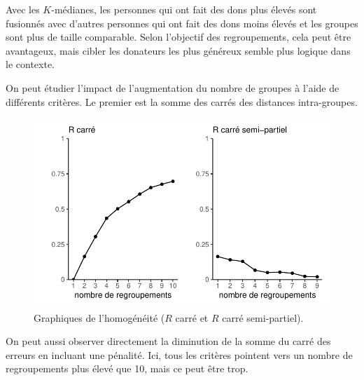 \documentclass[
  11pt,
  letterpaper,
]{scrbook}
\newenvironment{Shaded}{\begin{snugshade}}{\end{snugshade}}
\newcommand{\CommentTok}[1]{\textcolor[rgb]{0.37,0.37,0.37}{#1}}
\newcommand{\ControlFlowTok}[1]{\textcolor[rgb]{0.00,0.23,0.31}{#1}}
\newcommand{\FunctionTok}[1]{\textcolor[rgb]{0.28,0.35,0.67}{#1}}
\newcommand{\NormalTok}[1]{\textcolor[rgb]{0.00,0.23,0.31}{#1}}
\newcommand{\OtherTok}[1]{\textcolor[rgb]{0.00,0.23,0.31}{#1}}
\newcommand{\SpecialCharTok}[1]{\textcolor[rgb]{0.37,0.37,0.37}{#1}}
\theoremstyle{definition}
\theoremstyle{remark}
\begin{document}
Avec les \(K\)-médianes, les personnes qui ont fait des dons plus élevés
sont fusionnés avec d'autres personnes qui ont fait des dons moins
élevés et les groupes sont plus de taille comparable. Selon l'objectif
des regroupements, cela peut être avantageux, mais cibler les donateurs
les plus généreux semble plus logique dans le contexte.

On peut étudier l'impact de l'augmentation du nombre de groupes à l'aide
de différents critères. Le premier est la somme des carrés des distances
intra-groupes.

\begin{Shaded}
\end{Shaded}

\begin{figure}[ht!]

{\centering \includegraphics{regroupements_files/figure-pdf/fig-homogeneite-1.pdf}

}

\caption{\label{fig-homogeneite}Graphiques de l'homogénéité (\(R\) carré
et \(R\) carré semi-partiel).}

\end{figure}

On peut aussi observer directement la diminution de la somme du carré
des erreurs en incluant une pénalité. Ici, tous les critères pointent
vers un nombre de regroupements plus élevé que 10, mais ce peut être
trop.
\end{document}

